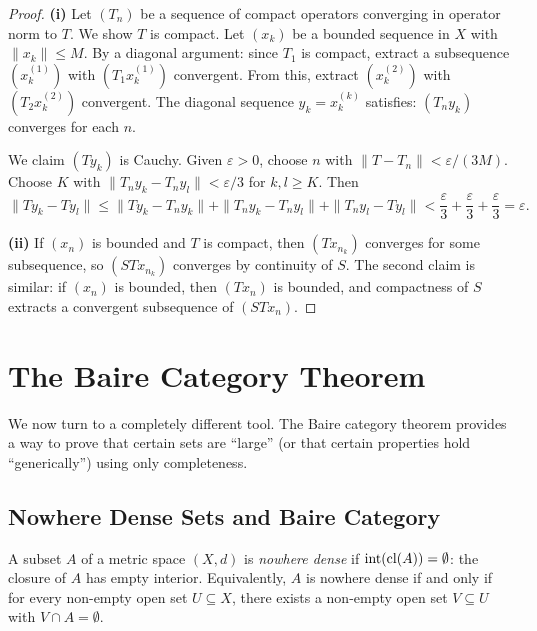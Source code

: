 \documentclass[11pt,a4paper]{article}
\begin{document}
\begin{proof}
\textbf{(i)} Let $(T_n)$ be a sequence of compact operators converging in
operator norm to $T$. We show $T$ is compact. Let $(x_k)$ be a bounded
sequence in $X$ with $\|x_k\| \le M$. By a diagonal argument: since $T_1$
is compact, extract a subsequence $(x_k^{(1)})$ with $(T_1 x_k^{(1)})$
convergent. From this, extract $(x_k^{(2)})$ with $(T_2 x_k^{(2)})$
convergent. The diagonal sequence $y_k = x_k^{(k)}$ satisfies: $(T_n y_k)$
converges for each $n$.

We claim $(Ty_k)$ is Cauchy. Given $\varepsilon > 0$, choose $n$ with
$\|T - T_n\| < \varepsilon/(3M)$. Choose $K$ with
$\|T_n y_k - T_n y_l\| < \varepsilon/3$ for $k, l \ge K$. Then
\[
\|Ty_k - Ty_l\| \le \|Ty_k - T_n y_k\| + \|T_n y_k - T_n y_l\|
+ \|T_n y_l - Ty_l\|
< \frac{\varepsilon}{3} + \frac{\varepsilon}{3} + \frac{\varepsilon}{3}
= \varepsilon.
\]

\textbf{(ii)} If $(x_n)$ is bounded and $T$ is compact, then $(Tx_{n_k})$
converges for some subsequence, so $(STx_{n_k})$ converges by continuity of
$S$. The second claim is similar: if $(x_n)$ is bounded, then $(Tx_n)$ is
bounded, and compactness of $S$ extracts a convergent subsequence of
$(STx_n)$.
\end{proof}


\section{The Baire Category Theorem}
\label{sec:baire}

We now turn to a completely different tool. The Baire category theorem
provides a way to prove that certain sets are ``large'' (or that certain
properties hold ``generically'') using only completeness.

\subsection{Nowhere Dense Sets and Baire Category}

\begin{definition}
\label{def:nowhere_dense}
A subset $A$ of a metric space $(X,d)$ is \emph{nowhere dense} if
$\operatorname{int}(\operatorname{cl}(A)) = \emptyset$: the closure of $A$ has empty interior.
Equivalently, $A$ is nowhere dense if and only if for every non-empty open
set $U \subseteq X$, there exists a non-empty open set
$V \subseteq U$ with $V \cap A = \emptyset$.
\end{definition}
\end{document}
